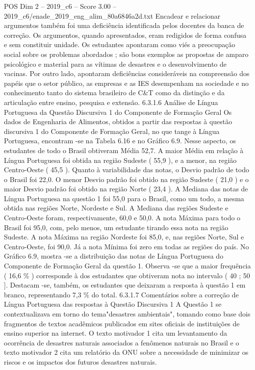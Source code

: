\begin{textsample}{POS Dim 2 – 2019\_c6 – Score 3.00 – 2019\_c6/enade\_2019\_eng\_alim\_80a6846a2d.txt}
Encadear e relacionar argumentos também foi uma deficiência identificada pelos docentes da banca de correção.
Os argumentos, quando apresentados, eram redigidos de forma confusa e sem constituir unidade.
Os estudantes apontaram como viés a preocupação social sobre os problemas abordados ; são bons exemplos as propostas de amparo psicológico e material para as vítimas de desastres e o desenvolvimento de vacinas.
Por outro lado, apontaram deficiências consideráveis na compreensão dos papéis que o setor público, as empresas e as IES desempenham na sociedade e no conhecimento tanto do sistema brasileiro de C\&T como da distinção e da articulação entre ensino, pesquisa e extensão. 6.3.1.6 Análise de Língua Portuguesa da Questão Discursiva 1 do Componente de Formação Geral Os dados de Engenharia de Alimentos, obtidos a partir das respostas à questão discursiva 1 do Componente de Formação Geral, no que tange à Língua Portuguesa, encontram -se na Tabela 6.16 e no Gráfico 6.9.
Nesse aspecto, os estudantes de todo o Brasil obtiveram Média 52,7.
A maior Média em relação à Língua Portuguesa foi obtida na região Sudeste ( 55,9 ), e a menor, na região Centro-Oeste ( 45,5 ).
Quanto à variabilidade das notas, o Desvio padrão de todo o Brasil foi 22,0.
O menor Desvio padrão foi obtido na região Sudeste ( 21,0 ) e o maior Desvio padrão foi obtido na região Norte ( 23,4 ).
A Mediana das notas de Língua Portuguesa na questão 1 foi 55,0 para o Brasil, como um todo, a mesma obtida nas regiões Norte, Nordeste e Sul.
A Mediana das regiões Sudeste e Centro-Oeste foram, respectivamente, 60,0 e 50,0.
A nota Máxima para todo o Brasil foi 95,0, com, pelo menos, um estudante tirando essa nota na região Sudeste.
A nota Máxima na região Nordeste foi 85,0, e, nas regiões Norte, Sul e Centro-Oeste, foi 90,0.
Já a nota Mínima foi zero em todas as regiões do país.
No Gráfico 6.9, mostra -se a distribuição das notas de Língua Portuguesa do Componente de Formação Geral da questão 1.
Observa -se que a maior frequência ( 16,6 \% ) corresponde à dos estudantes que obtiveram nota no intervalo ( 40 ; 50 ].
Destacam -se, também, os estudantes que deixaram a resposta à questão 1 em branco, representando 7,3 \% do total. 6.3.1.7 Comentários sobre a correção de Língua Portuguesa das respostas à Questão Discursiva 1 A Questão 1 se contextualizava em torno do tema"desastres ambientais", tomando como base dois fragmentos de textos acadêmicos publicados em sites oficiais de instituições de ensino superior na internet.
O texto motivador 1 cita um levantamento da ocorrência de desastres naturais associados a fenômenos naturais no Brasil e o texto motivador 2 cita um relatório da ONU sobre a necessidade de minimizar os riscos e os impactos dos futuros desastres naturais.

\end{textsample}
